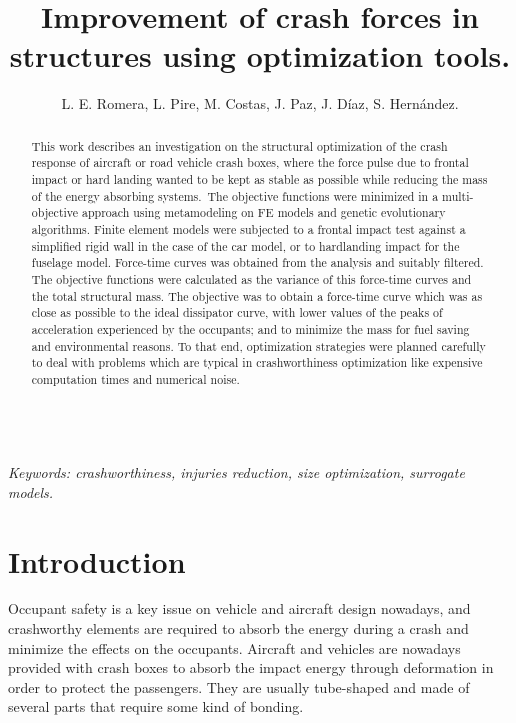 \documentclass[cmfonts]{witpress}
\begin{document}
\title{Improvement of crash forces in structures using optimization tools.}

\author{L. E. Romera, L. Pire, M. Costas, J. Paz, J. D\'iaz, S. Hern\'andez.}

\address{Structural Mechanics Group, Universidade da Coru\~na, Spain.}

\maketitle

\begin{abstract}
This work describes an investigation on the structural optimization of the crash response of aircraft or road vehicle crash boxes, where the force pulse due to frontal impact or hard landing wanted to be kept as stable as possible while reducing the mass of the energy absorbing systems. The objective functions were minimized in a multi-objective approach using metamodeling on FE models and genetic evolutionary algorithms. Finite element models were subjected to a frontal impact test against a simplified rigid wall in the case of the car model, or to hardlanding impact for the fuselage model. Force-time curves was obtained from the analysis and suitably filtered. The objective functions were calculated as the variance of this force-time curves and the total structural mass. The objective was to obtain a force-time curve which was as close as possible to the ideal dissipator curve, with lower values of the peaks of acceleration experienced by the occupants; and to minimize the mass for fuel saving and environmental reasons. To that end, optimization strategies were planned carefully to deal with problems which are typical in crashworthiness optimization like expensive computation times and numerical noise.
\end{abstract}\\
\emph{Keywords: crashworthiness, injuries reduction, size optimization, surrogate models.}

\section{Introduction}
Occupant safety is a key issue on vehicle and aircraft design nowadays, and crashworthy elements are required to absorb the energy during a crash and minimize the effects on the occupants. Aircraft and vehicles are nowadays provided with crash boxes to absorb the impact energy through deformation in order to protect the passengers. They are usually tube-shaped and made of several parts that require some kind of bonding.
\end{document}
